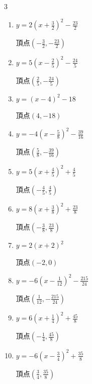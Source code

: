 \begin{multicols}{3}
\begin{enumerate}
  \item $\displaystyle y=2\left( x+\frac{3}{2}\right)^{2}-\frac{23}{2}$

        $\displaystyle 頂点\left( -\frac{3}{2} , -\frac{23}{2} \right)$

  \item $\displaystyle y=5\left( x-\frac{2}{5}\right)^{2}-\frac{24}{5}$

        $\displaystyle 頂点\left( \frac{2}{5} , -\frac{24}{5} \right)$

\columnbreak %

  \item $\displaystyle y=\left( x-4\right)^{2}-18$

        $\displaystyle 頂点\left( 4 , -18 \right)$

  \item $\displaystyle y=-4\left( x-\frac{5}{8}\right)^{2}-\frac{39}{16}$

        $\displaystyle 頂点\left( \frac{5}{8} , -\frac{39}{16} \right)$

  \item $\displaystyle y=5\left( x+\frac{4}{5}\right)^{2}+\frac{4}{5}$

        $\displaystyle 頂点\left( -\frac{4}{5} , \frac{4}{5} \right)$

  \item $\displaystyle y=8\left( x+\frac{3}{8}\right)^{2}+\frac{23}{8}$

        $\displaystyle 頂点\left( -\frac{3}{8} , \frac{23}{8} \right)$

  \item $\displaystyle y=2\left( x+2\right)^{2}$

        $\displaystyle 頂点\left( -2 , 0 \right)$

  \item $\displaystyle y=-6\left( x-\frac{1}{12}\right)^{2}-\frac{215}{24}$

        $\displaystyle 頂点\left( \frac{1}{12} , -\frac{215}{24} \right)$

  \item $\displaystyle y=6\left( x+\frac{1}{4}\right)^{2}+\frac{45}{8}$

        $\displaystyle 頂点\left( -\frac{1}{4} , \frac{45}{8} \right)$

  \item $\displaystyle y=-6\left( x-\frac{3}{4}\right)^{2}+\frac{35}{8}$

        $\displaystyle 頂点\left( \frac{3}{4} , \frac{35}{8} \right)$


\end{enumerate}
\end{multicols}

